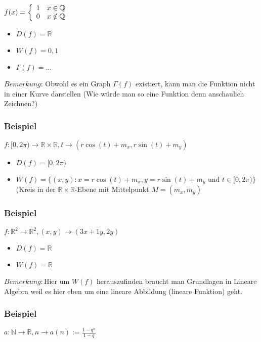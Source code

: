 \documentclass[11pt]{article} %
\begin{document}
$f(x) = \left\{
\begin{array}{l l}
1 & x \in \mathbb{Q}\\
0 & x \notin \mathbb{Q}\\
\end{array}\right.$\\

\begin{itemize}
\item $D(f) = \mathbb{R}$
\item $W(f) = {0,1}$
\item $\Gamma(f) =...$
\end{itemize}

$Bemerkung$: Obwohl es ein Graph $\Gamma(f)$ existiert, kann man die Funktion nicht in einer Kurve darstellen (Wie würde man so eine Funktion denn anschaulich Zeichnen?)


\subsubsection{Beispiel}
$f: [0,2\pi) \rightarrow \mathbb{R} \times \mathbb{R}, t \rightarrow (r \cos(t) + m_x, r \sin(t) + m_y)$
\begin{itemize}
\item $D(f) = [0,2\pi)$
\item $W(f) = \{(x,y): x = r\cos(t) + m_x, y = r\sin(t) + m_y \textrm{ und } t \in [0,2\pi)\}$ 
\\(Kreis in der $\mathbb{R} \times \mathbb{R}$-Ebene mit Mittelpunkt $M = (m_x, m_y)$
\end{itemize}

\subsubsection{Beispiel}
$f: \mathbb{R}^2 \rightarrow \mathbb{R}^2, (x,y) \rightarrow (3x + 1 y, 2y) $
\begin{itemize}
\item $D(f) = \mathbb{R}$
\item $W(f) = \mathbb{R}$
\end{itemize}

$Bemerkung: $Hier um $W(f)$ herauszufinden braucht man Grundlagen in Lineare Algebra weil es hier eben um eine lineare Abbildung (lineare Funktion) geht.

\subsubsection{Beispiel}
$a: \mathbb{N} \rightarrow \mathbb{R}, n \rightarrow a(n) := \frac{1-q^n}{1-q}$
\end{document}
